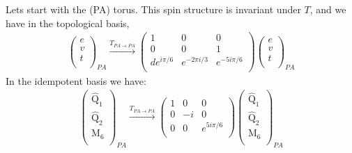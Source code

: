 \documentclass[12pt,a4paper]{article}
\newcounter{arrow}
\begin{document}
Lets start with the (PA) torus. 
This spin structure is invariant under $T$, and we have in the topological basis,
\begin{align}
\left( \begin{matrix}
e\\
v\\
t\\
\end{matrix} \right)_{PA} \xrightarrow{T_{PA \rightarrow PA}} 
\left( \begin{matrix}
1 & 0 & 0 \\
0 & 0 & 1 \\
d e^{i \pi /6} & e^{-2 \pi i/3} & e^{- 5i \pi /6}\\
\end{matrix} \right) 
\left( \begin{matrix}
e\\
v\\
t\\
\end{matrix} \right)_{PA}
\end{align}
In the idempotent basis we have:
\begin{align}
\left( \begin{matrix}
\widehat{\text{Q}}_1\\
\widehat{\text{Q}}_2\\
\text{M}_6\\
\end{matrix} \right)_{PA} \xrightarrow{T_{PA \rightarrow PA}}
\left( \begin{matrix}
1 & 0 & 0\\
0 & -i & 0 \\
0 & 0& e^{5i \pi /6} \\
\end{matrix} \right)
\left( \begin{matrix}
\widehat{\text{Q}}_1\\
\widehat{\text{Q}}_2\\
\text{M}_6\\
\end{matrix} \right)_{PA}
\end{align}
\end{document}
